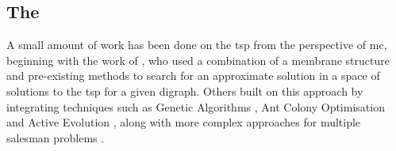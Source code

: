
\subsection{The }



A small amount of work has been done on the \gls{tsp} from the perspective of \gls{mc}, beginning with the work of \citeauthor{Nishida2006} \cite{Nishida2006}, who used a combination of a membrane structure and pre-existing methods to search for an approximate solution in a space of solutions to the \gls{tsp} for a given digraph.  Others built on this approach by integrating techniques such as Genetic Algorithms \cite{Manalastas2013,He2014}, Ant Colony Optimisation \cite{Zhang2011} and Active Evolution \cite{Song2015}, along with more complex approaches for multiple salesman problems \cite{He2015}.%

